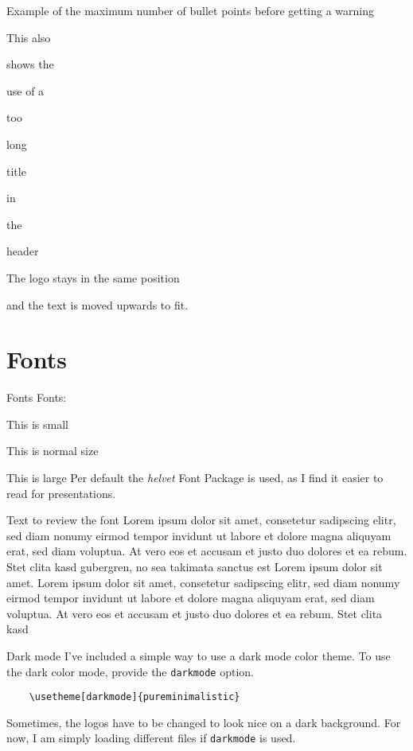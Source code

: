 \documentclass[aspectratio=169]{beamer}
\begin{document}
\begin{frame}{Example of the maximum number of bullet points before getting a warning}
  \begin{vfilleditems}
    \item This also
    \item shows the
    \item use of a
    \item too
    \item long
    \item title
    \item in
    \item the
    \item header
    \item The logo stays in the same position
    \item and the text is moved upwards to fit.
  \end{vfilleditems}
\end{frame}

\section{Fonts}
\begin{frame}[fragile]{Fonts}
  Fonts:

  {\small This is small}

  This is normal size

    {\large This is large}
  \vfill
  Per default the \emph{helvet} Font Package is
  used, as I find it easier to read for presentations.
\end{frame}

\begin{frame}{Text to review the font}
  Lorem ipsum dolor sit amet, consetetur sadipscing elitr,
  sed diam nonumy eirmod tempor invidunt ut labore et dolore magna
  aliquyam erat, sed diam voluptua. At vero eos et accusam et justo
  duo dolores et ea rebum. Stet clita kasd gubergren, no sea takimata
  sanctus est Lorem ipsum dolor sit amet. Lorem ipsum dolor sit amet,
  consetetur sadipscing elitr, sed diam nonumy eirmod tempor invidunt
  ut labore et dolore magna aliquyam erat, sed diam voluptua. At vero
  eos et accusam et justo duo dolores et ea rebum. Stet clita kasd
\end{frame}

\begin{frame}[fragile]{Dark mode}
  I've included a simple way to use a dark mode
  color theme. To use the dark color mode, provide the \texttt{darkmode}
  option.
  \begin{verbatim}
    \usetheme[darkmode]{pureminimalistic}
    \end{verbatim}
  Sometimes, the logos have to be changed to look nice on a
  dark background. For now, I am simply loading different
  files if \texttt{darkmode} is used.
\end{frame}
\end{document}
